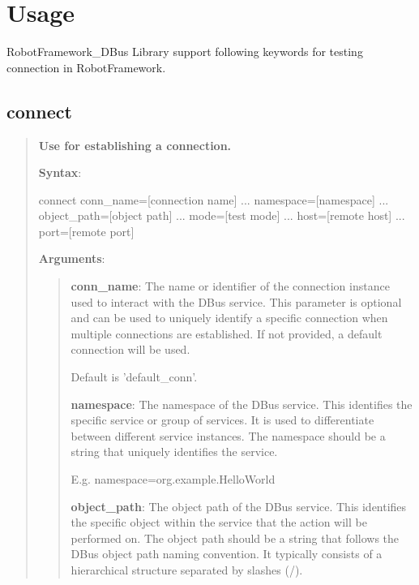 \hypertarget{usage}{%
\section{Usage}\label{description-usage}}

RobotFramework\_DBus Library support following keywords for testing connection in RobotFramework.

\hypertarget{description-connect}{%
\subsection{\texorpdfstring{\textbf{connect}}{connect}}\label{description-connect}}

\begin{quote}
\textbf{Use for establishing a connection.}

\textbf{Syntax}:

\begin{robotcode}
connect		conn_name=[connection name] 
...    		namespace=[namespace] 
...    		object_path=[object path] 
...    		mode=[test mode] 
...    		host=[remote host] 
...    		port=[remote port]
\end{robotcode}

\textbf{Arguments}:

\begin{quote}
\textbf{conn\_name}: The name or identifier of the connection instance used to interact with the DBus service.
  This parameter is optional and can be used to uniquely identify a specific connection
  when multiple connections are established. If not provided, a default connection will be used.

  Default is 'default\_conn'.

\vspace{\baselineskip}

\textbf{namespace}: The namespace of the DBus service.
  This identifies the specific service or group of services.
  It is used to differentiate between different service instances.
  The namespace should be a string that uniquely identifies the service.

  E.g. namespace=org.example.HelloWorld

\vspace{\baselineskip}

\textbf{object\_path}: The object path of the DBus service.
  This identifies the specific object within the service that the action will be performed on.
  The object path should be a string that follows the DBus object path naming convention.
  It typically consists of a hierarchical structure separated by slashes (/).


\end{quote}
\end{quote}
